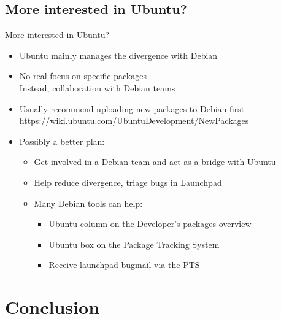 \documentclass[10pt,final]{beamer}
\begin{document}
\subsection{More interested in Ubuntu?}
\begin{frame}{More interested in Ubuntu?}
  \begin{itemize}
  \item Ubuntu mainly manages the divergence with Debian
    \br
  \item No real focus on specific packages\\
    Instead, collaboration with Debian teams
    \br
  \item Usually recommend uploading new packages to Debian first\\
    \url{https://wiki.ubuntu.com/UbuntuDevelopment/NewPackages}
    \br
  \item Possibly a better plan:
    \begin{itemize}
    \item Get involved in a Debian team and act as a bridge with Ubuntu
      \hbr
    \item Help reduce divergence, triage bugs in Launchpad
      \hbr
    \item Many Debian tools can help:
      \begin{itemize}
      \item Ubuntu column on the Developer's packages overview
      \item Ubuntu box on the Package Tracking System
      \item Receive launchpad bugmail via the PTS
      \end{itemize}
    \end{itemize}
  \end{itemize}
\end{frame}

\section{Conclusion}
\end{document}
